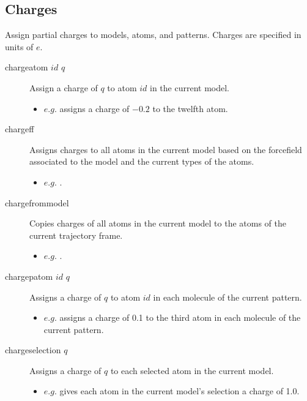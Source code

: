 \subsection{Charges}
Assign partial charges to models, atoms, and patterns. Charges are specified in units of $e$.\\
\begin{description}

	\item[chargeatom $id$ $q$\its] Assign a charge of $q$ to atom $id$ in the current model.
	\begin{itemize}
		\item $e.g.$  assigns a charge of $-0.2$ to the twelfth atom.
	\end{itemize}

	\item[chargeff\its] Assigns charges to all atoms in the current model based on the forcefield associated to the model and the current types of the atoms.
	\begin{itemize}
		\item $e.g.$ .
	\end{itemize}

	\item[chargefrommodel\its] Copies charges of all atoms in the current model to the atoms of the current trajectory frame.
	\begin{itemize}
		\item $e.g.$ .
	\end{itemize}

	\item[chargepatom $id$ $q$\its] Assigns a charge of $q$ to atom $id$ in each molecule of the current pattern.
	\begin{itemize}
		\item $e.g.$  assigns a charge of 0.1 to the third atom in each molecule of the current pattern.
	\end{itemize}

	\item[chargeselection $q$\its] Assigns a charge of $q$ to each selected atom in the current model.
	\begin{itemize}
		\item $e.g.$  gives each atom in the current model's selection a charge of 1.0.
	\end{itemize}


\end{description}
